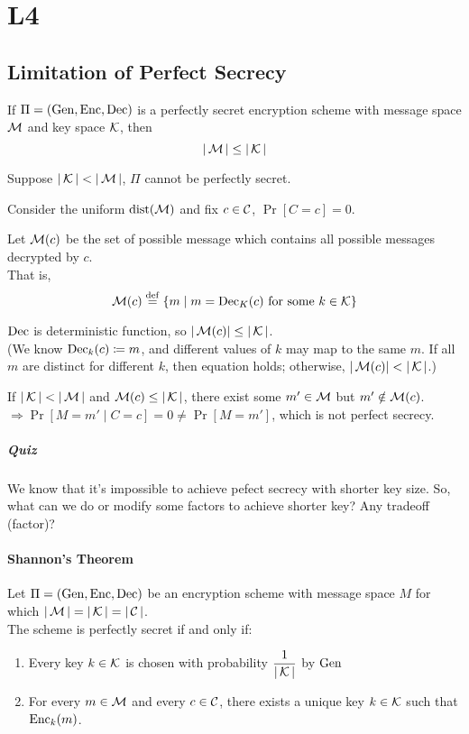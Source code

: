 \section{L4}


\subsection{Limitation of Perfect Secrecy}

\begin{theorem}
	If \(\Pi = (\operatorname{Gen}, \operatorname{Enc}, \operatorname{Dec})\) is a perfectly secret encryption  scheme with message space \(\operatorname{\mathcal{M}}\) and key space \(\operatorname{\mathcal{K}}\), then
	\[|\operatorname{\mathcal{M}}| \le |\operatorname{\mathcal{K}}| \]
\end{theorem}

\begin{myProof}
	Suppose \(|\operatorname{\mathcal{K}}| < |\operatorname{\mathcal{M}}|\), \(\Pi\) cannot be perfectly secret.

	Consider the uniform \(\operatorname{dist}(\operatorname{\mathcal{M}})\) and fix \(c \in \operatorname{\mathcal{C}}\), \(\Pr[C = c] = 0\).
	
	Let \(\operatorname{\mathcal{M}}(c)\) be the set of possible message which contains all possible messages decrypted by \(c\). \\ That is,
	\[\operatorname{\mathcal{M}}(c) \overset{\mathrm{def}}{=} \{m \mid m = \operatorname{Dec}_K(c) \text{ for some } k \in \operatorname{\mathcal{K}}\}\]
	
	\(\operatorname{Dec}\) is deterministic function, so \(|\operatorname{\mathcal{M}}(c)| \le |\operatorname{\mathcal{K}}|\). \\
	(We know \(\operatorname{Dec}_k(c) \coloneq m\), and different values of \(k\) may map to the same \(m\). If all \(m\) are distinct for different \(k\), then equation holds; otherwise, \(|\operatorname{\mathcal{M}}(c)| < |\operatorname{\mathcal{K}}|\).)
	
	If \(|\operatorname{\mathcal{K}}| < |\operatorname{\mathcal{M}}|\) and \(\operatorname{\mathcal{M}}(c) \le |\operatorname{\mathcal{K}}|\), there exist some \(m' \in \operatorname{\mathcal{M}} \) but \(m' \notin \operatorname{\mathcal{M}}(c)\). \\
	\(\Rightarrow \Pr[M = m' \mid C = c] = 0 \neq \Pr[M = m']\), which is not perfect secrecy.
\end{myProof}

\subparagraph{Quiz}

We know that it's impossible to achieve pefect secrecy with shorter key size. So, what can we do or modify some factors to achieve shorter key? Any tradeoff (factor)?


\paragraph{Shannon's Theorem}

\begin{theorem}
	Let \(\Pi = (\operatorname{Gen}, \operatorname{Enc}, \operatorname{Dec})\) be an encryption scheme with message space \(M\) for which \(|\operatorname{\mathcal{M}}|=|\operatorname{\mathcal{K}}|=|\operatorname{\mathcal{C}}|\). \\
	The scheme is perfectly secret if and only if:
	\begin{enumerate}[topsep=-\parskip]
		\item Every key \(k \in \operatorname{\mathcal{K}}\) is chosen with probability \(\displaystyle\frac{1}{|\operatorname{\mathcal{K}}|}\) by \(\operatorname{Gen}\)
		\item For every \(m \in \operatorname{\mathcal{M}}\) and every \(c \in \operatorname{\mathcal{C}}\), there exists a unique key \(k \in \operatorname{\mathcal{K}}\) such that \(\operatorname{Enc}_k(m)\).
	\end{enumerate}
\end{theorem}

